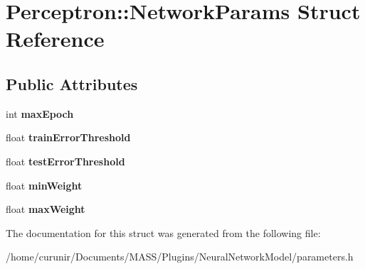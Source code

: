 \hypertarget{struct_perceptron_1_1_network_params}{}\section{Perceptron\+:\+:Network\+Params Struct Reference}
\label{struct_perceptron_1_1_network_params}
\subsection*{Public Attributes}
\begin{DoxyCompactItemize}
\item 
int {\bfseries max\+Epoch}\hypertarget{struct_perceptron_1_1_network_params_a955f8919dc3d743bcbd0bf9a3f6106a2}{}\label{struct_perceptron_1_1_network_params_a955f8919dc3d743bcbd0bf9a3f6106a2}

\item 
float {\bfseries train\+Error\+Threshold}\hypertarget{struct_perceptron_1_1_network_params_acfaab07fcc5107fcea07e99696c0b311}{}\label{struct_perceptron_1_1_network_params_acfaab07fcc5107fcea07e99696c0b311}

\item 
float {\bfseries test\+Error\+Threshold}\hypertarget{struct_perceptron_1_1_network_params_a15a189b1d36274a9e51681b9097e9ff8}{}\label{struct_perceptron_1_1_network_params_a15a189b1d36274a9e51681b9097e9ff8}

\item 
float {\bfseries min\+Weight}\hypertarget{struct_perceptron_1_1_network_params_acf2c3e30c38ba223b045878bfbe246ac}{}\label{struct_perceptron_1_1_network_params_acf2c3e30c38ba223b045878bfbe246ac}

\item 
float {\bfseries max\+Weight}\hypertarget{struct_perceptron_1_1_network_params_ad508697bc7cda2e68075186ec1b81ca3}{}\label{struct_perceptron_1_1_network_params_ad508697bc7cda2e68075186ec1b81ca3}

\end{DoxyCompactItemize}


The documentation for this struct was generated from the following file\+:\begin{DoxyCompactItemize}
\item 
/home/curunir/\+Documents/\+M\+A\+S\+S/\+Plugins/\+Neural\+Network\+Model/parameters.\+h\end{DoxyCompactItemize}
